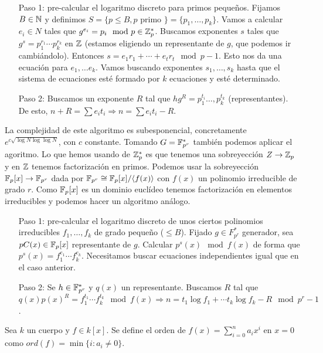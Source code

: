 \documentclass[CR.tex]{subfiles}
\begin{document}
\begin{enumerate}
\item[Paso 1:] pre-calcular el logaritmo discreto para primos pequeños. Fijamos $B\in\mathbb{N}$ y definimos $S=\{p\leq B, p\text{ primo }\}=\{p_1,\dots, p_k\}$. Vamos a calcular $e_i\in N$ tales que $g^{e_i}=p_i\mod p\in\mathbb{Z}_p^*$. Buscamos exponentes $s$ tales que $g^s=p_1^{r_1}\cdots p_k^{r_k}$ en $\mathbb{Z}$ (estamos eligiendo un representante de $g$, que podemos ir cambiándolo). Entonces $s=e_1r_1+\cdots+e_tr_t\mod p-1$. Esto nos da una ecuación para $e_1,\dots e_k$. Vamos buscando exponentes $s_1,\dots, s_k$  hasta que el sistema de ecuaciones esté formado por $k$ ecuaciones y esté determinado.
\item[Paso 2:] Buscamos un exponente $R$ tal que $hg^R=p_1^{t_i}\dots, p_k^{t_k}$ (representantes). De esto, $n+R=\sum e_it_i\Rightarrow n=\sum e_it_i-R$. 
\end{enumerate}

La complejidad de este algoritmo es subesponencial, concretamente $e^{c\sqrt{\log N\log\log N}}$, con $c$ constante. Tomando $G=\mathbb{F}_{p^r}^*$ también podemos aplicar el agoritmo. Lo que hemos usando de $\mathbb{Z}_p^*$ es que tenemos una sobreyección $Z\to \mathbb{Z}_p$ y en $\mathbb{Z}$ tenemos factorización en primos. Podemos usar la sobreyección $\mathbb{F}_p[x]\to \mathbb{F}_{p^r}$ dada por $\mathbb{F}_{p^r}\cong \mathbb{F}_p[x]/\langle{f(x)}\rangle$ con $f(x)$ un polinomio irreducible de grado $r$. Como $\mathbb{F}_p[x]$ es un dominio euclídeo tenemos factorización en elementos irreducibles y podemos hacer un algoritmo análogo.

\begin{enumerate}
\item[Paso 1:] pre-calcular el logaritmo discreto de unos ciertos polinomios irreducibles $f_1,\dots, f_k$ de grado pequeño ($\leq B$). Fijado $g\in F_{p^r}^*$ generador, sea $pC(x)\in\mathbb{F}_p[x]$ representante de $g$. Calcular $p^s(x)\mod f(x)$ de forma que $p^s(x)=f_1^{e_1}\cdots f_k^{e_k}$. Necesitamos buscar ecuaciones independientes igual que en el caso anterior.
\item[Paso 2:] Se $h\in\mathbb{F}_{p^r}^*$ y $q(x)$ un representante. Buscamos $R$ tal que  $q(x)p(x)^R=f_1^{t_1}\cdots f_k^{t_k}\mod f(x)\Rightarrow n=t_1\log f_1+\cdots t_k\log f_k-R\mod p^r-1$. 
\end{enumerate} 

\begin{defi}
Sea $k$ un cuerpo y $f\in k[x]$. Se define el orden de $f(x)=\sum_{i=0}^na_ix^i$ en $x=0$ como $ord(f)=\min\{i:a_i\neq 0\}$. 
\end{defi}
\end{document}
